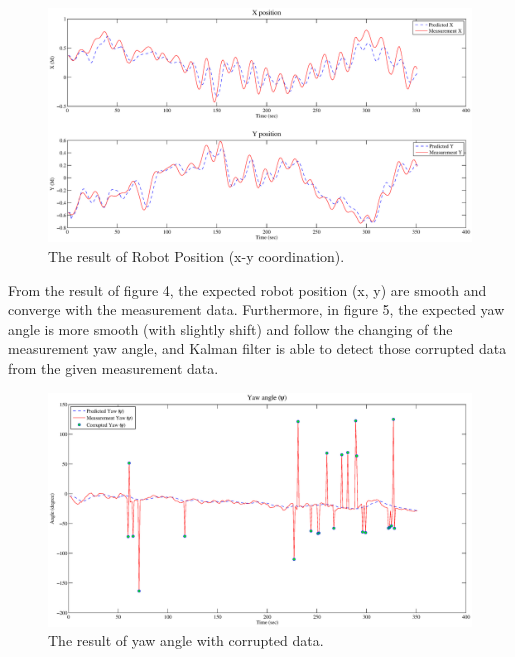 \documentclass[10pt,letterpaper]{article}
\begin{document}
  \begin{figure}[H]
	 \begin{center}
	 	\includegraphics[width=\textwidth]{part3_xy.eps}
	 	\caption{The result of Robot Position (x-y coordination).}
	 \end{center}
 \end{figure}
 From the result of figure 4, the expected robot position (x, y) are smooth and converge with the 
 measurement data. Furthermore, in figure 5, the expected yaw angle is more smooth (with slightly shift) and 
 follow the changing of the measurement yaw angle, and Kalman filter is able to detect those corrupted data 
 from the given measurement data.
 \begin{figure}[H]
	 \begin{center}
	 	\includegraphics[width=\textwidth]{part3_yaw.eps}
	 	\caption{The result of yaw angle with corrupted data.}
	 \end{center}
 \end{figure}
\end{document}
